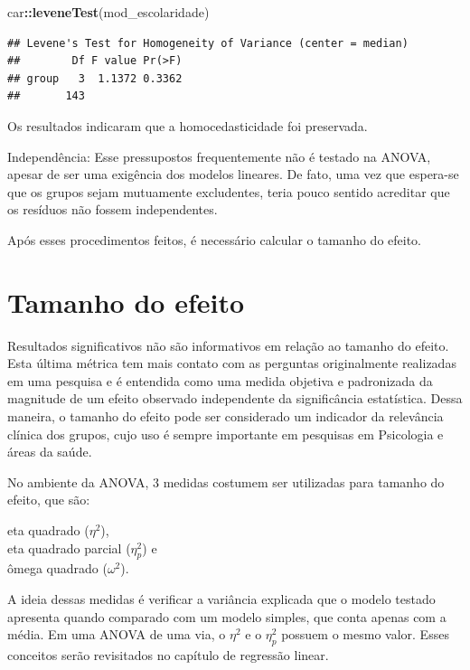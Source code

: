 \documentclass[
]{book}
\newenvironment{Shaded}{\begin{snugshade}}{\end{snugshade}}
\newcommand{\KeywordTok}[1]{\textcolor[rgb]{0.13,0.29,0.53}{\textbf{#1}}}
\newcommand{\NormalTok}[1]{#1}
\newcommand{\OperatorTok}[1]{\textcolor[rgb]{0.81,0.36,0.00}{\textbf{#1}}}
\begin{document}
\begin{Shaded}
\begin{Highlighting}[]
\NormalTok{car}\OperatorTok{::}\KeywordTok{leveneTest}\NormalTok{(mod_escolaridade)}
\end{Highlighting}
\end{Shaded}

\begin{verbatim}
## Levene's Test for Homogeneity of Variance (center = median)
##        Df F value Pr(>F)
## group   3  1.1372 0.3362
##       143
\end{verbatim}

Os resultados indicaram que a homocedasticidade foi preservada.

Independência: Esse pressupostos frequentemente não é testado na ANOVA, apesar de ser uma exigência dos modelos lineares. De fato, uma vez que espera-se que os grupos sejam mutuamente excludentes, teria pouco sentido acreditar que os resíduos não fossem independentes.

Após esses procedimentos feitos, é necessário calcular o tamanho do efeito.

\hypertarget{tamanho-do-efeito-3}{%
\section{Tamanho do efeito}\label{tamanho-do-efeito-3}}

Resultados significativos não são informativos em relação ao tamanho do efeito. Esta última métrica tem mais contato com as perguntas originalmente realizadas em uma pesquisa e é entendida como uma medida objetiva e padronizada da magnitude de um efeito observado independente da significância estatística. Dessa maneira, o tamanho do efeito pode ser considerado um indicador da relevância clínica dos grupos, cujo uso é sempre importante em pesquisas em Psicologia e áreas da saúde.

No ambiente da ANOVA, 3 medidas costumem ser utilizadas para tamanho do efeito, que são:

eta quadrado (\(\eta^2\)),\\
eta quadrado parcial (\(\eta_p^2\)) e\\
ômega quadrado (\(\omega^2\)).

A ideia dessas medidas é verificar a variância explicada que o modelo testado apresenta quando comparado com um modelo simples, que conta apenas com a média. Em uma ANOVA de uma via, o \(\eta^2\) e o \(\eta_p^2\) possuem o mesmo valor. Esses conceitos serão revisitados no capítulo de regressão linear.
\end{document}
